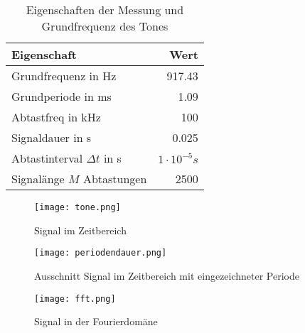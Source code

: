 \begin{table}[H]
\centering
\begin{tabular}{l|r}
Eigenschaft & Wert \\ \hline
Grundfrequenz in Hz & 917.43\\
Grundperiode in ms & 1.09\\
Abtastfreq in kHz & 100\\
Signaldauer in s & 0.025\\
Abtastinterval $\Delta t$ in s & $1 \cdot 10^{-5}s$\\
Signalänge $M$ Abtastungen & 2500\\
\end{tabular}
\caption{Eigenschaften der Messung und Grundfrequenz des Tones}
\label{tab:Eigenschaften}
\end{table}

\begin{figure}[H]
\centering
\texttt{[image: tone.png]}
\caption{Signal im Zeitbereich}
\label{img:SIGNALZEITBEREICH}
\end{figure}

\begin{figure}[H]
\centering
\texttt{[image: periodendauer.png]}
\caption{Ausschnitt Signal im Zeitbereich mit eingezeichneter Periode}
\label{img:SIGNALPERIODE}
\end{figure}


\begin{figure}[H]
\centering
\texttt{[image: fft.png]}
\caption{Signal in der Fourierdomäne}
\label{img:FFT}
\end{figure}


